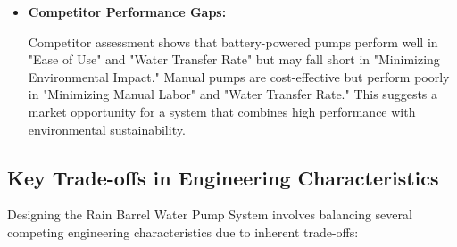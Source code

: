 \documentclass[12pt]{report}
\begin{document}
\begin{itemize}
    \item \textbf{Competitor Performance Gaps:}

    Competitor assessment shows that battery-powered pumps perform well in "Ease of Use" and "Water Transfer Rate" but may fall short in "Minimizing Environmental Impact." Manual pumps are cost-effective but perform poorly in "Minimizing Manual Labor" and "Water Transfer Rate." This suggests a market opportunity for a system that combines high performance with environmental sustainability.

\end{itemize}

\subsection{Key Trade-offs in Engineering Characteristics}

Designing the Rain Barrel Water Pump System involves balancing several competing engineering characteristics due to inherent trade-offs:
\end{document}
